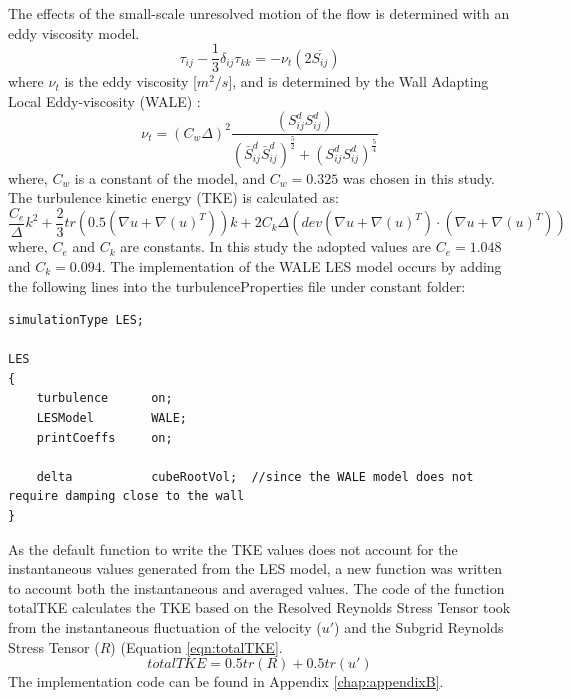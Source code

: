 \begin{refsection}
The effects of the small-scale unresolved motion of the flow is determined with an eddy viscosity model.
\begin{equation}
\tau_{ij}-\frac{1}{3} \delta_{ij} \tau_{kk}=-\nu_t\left ( 2\overline{S_{ij}}\right )
\end{equation}
where $\nu_t$ is the eddy viscosity [$m^2/s$], and is determined by the Wall Adapting Local Eddy-viscosity (WALE) \cite{nicoud1999}:
\begin{equation}
\nu_t=(C_w\Delta)^2\frac{\left ( S_{ij}^{d} S_{ij}^{d}\right )}{\left ( \bar{S}_{ij}^{d} \bar{S}_{ij}^{d} \right )^\frac{5}{2}+\left (S_{ij}^{d} S_{ij}^{d}  \right )^\frac{5}{4}}
\label{eqn:nutWALE}
\end{equation}
where, $C_w$ is a constant of the model, and $C_w =0.325$ was chosen in this study. The turbulence kinetic energy (TKE) is calculated as:
\begin{equation}
\frac{C_e}{\Delta}k^2+\frac{2}{3}tr\left ( 0.5\left ( \nabla u+\nabla (u)^T \right ) \right )k+2C_k\Delta\left ( dev \left ( \nabla u+\nabla (u)^T \right )\cdot \left ( \nabla u+\nabla (u)^T \right ) \right )
\label{eqn:tkeWALE}
\end{equation}
where, $C_e$ and $C_k$ are constants. In this study the adopted values are $C_e=1.048$ and $C_k=0.094$.
The implementation of the WALE LES model occurs by adding the following lines into the turbulenceProperties file under constant folder:
\begin{lstlisting}
simulationType LES;

LES
{
	turbulence      on;
	LESModel		WALE;
	printCoeffs		on;
	
	delta           cubeRootVol;  //since the WALE model does not require damping close to the wall
}
\end{lstlisting}
As the default function to write the TKE values does not account for the instantaneous values generated from the LES model, a new function was written to account both the instantaneous and averaged values. The code of the function totalTKE calculates the TKE based on the Resolved Reynolds Stress Tensor took from the instantaneous fluctuation of the velocity ($u'$) and the Subgrid Reynolds Stress Tensor ($R$) (Equation \ref{eqn:totalTKE}.
\begin{equation}
totalTKE= 0.5tr(R) + 0.5tr(u')
\label{eqn:totalTKE}
\end{equation}
The implementation code can be found in Appendix \ref{chap:appendixB}.


\end{refsection}
